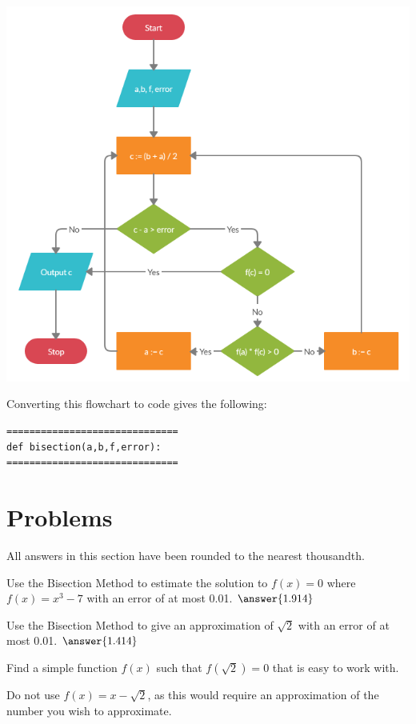 \documentclass{ximera}
\begin{document}
\begin{center}
	\includegraphics{bisection.png}
\end{center}

Converting this flowchart to code gives the following:

\begin{verbatim}
==============================
def bisection(a,b,f,error):
==============================
\end{verbatim}




\section{Problems}

All answers in this section have been rounded to the nearest thousandth.

\begin{question}
	Use the Bisection Method to estimate the solution to $f(x)=0$ where $f(x)=x^3-7$ with an error of at most 0.01. $\answer{1.914}$ 
\end{question}

\begin{question}
	Use the Bisection Method to give an approximation of $\sqrt{2}$ with an error of at most 0.01. $\answer{1.414}$
	\begin{hint}
		Find a simple function $f(x)$ such that $f(\sqrt{2})=0$ that is easy to work with.
	\end{hint}
	\begin{hint}
		Do not use $f(x)=x-\sqrt{2}$, as this would require an approximation of the number you wish to approximate.
	\end{hint}
\end{question}
\end{document}
